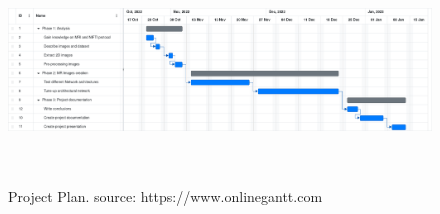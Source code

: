\begin{figure}[ht]
    \hspace*{-1.2in}
    \centering
    \includegraphics[width = 20cm, height = 6cm]{images/project-plan.png}
    \caption[]{Project Plan. source: https://www.onlinegantt.com}
    \label{fig:project-plan}
\end{figure}